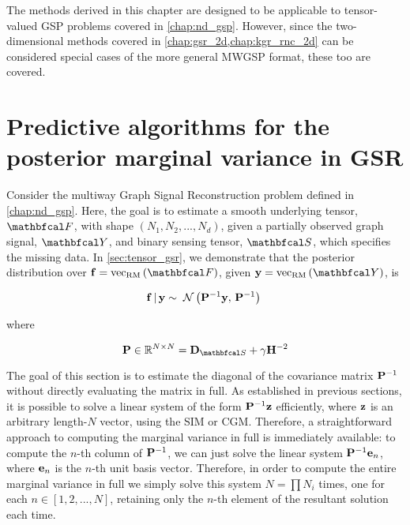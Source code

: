 The methods derived in this chapter are designed to be applicable to tensor-valued GSP problems covered in \cref{chap:nd_gsp}. However, since the two-dimensional methods covered in \cref{chap:gsr_2d,chap:kgr_rnc_2d} can be considered special cases of the more general MWGSP format, these too are covered. 

\section{Predictive algorithms for the posterior marginal variance in GSR}

Consider the multiway Graph Signal Reconstruction problem defined in \cref{chap:nd_gsp}. Here, the goal is to estimate a smooth underlying tensor, $\Ft$, with shape $(N_1, N_2, ..., N_d)$, given a partially observed graph signal, $\Yt$, and binary sensing tensor, $\St$, which specifies the missing data. In \cref{sec:tensor_gsr}, we demonstrate that the posterior distribution over $\f = \vecrm{\Ft}$, given $\y = \vecrm{\Yt}$, is

\begin{equation}
    \mathbf{f} \, | \, \mathbf{y} \sim \; \mathcal{N}\left(\mathbf{P}^{-1} \mathbf{y}, \, \mathbf{P}^{-1}\right) \;
\end{equation}

where 

\begin{equation}
    \PP \in \R^{N \times N} = \D_{\St} + \gamma \HH^{-2}
\end{equation}

The goal of this section is to estimate the diagonal of the covariance matrix $\mathbf{P}^{-1}$ without directly evaluating the matrix in full. As established in previous sections, it is possible to solve a linear system of the form $\mathbf{P}^{-1} \mathbf{z}$ efficiently, where $\mathbf{z}$ is an arbitrary length-$N$ vector, using the SIM or CGM. Therefore, a straightforward approach to computing the marginal variance in full is immediately available: to compute the $n$-th column of $\mathbf{P}^{-1}$, we can just solve the linear system $\mathbf{P}^{-1} \mathbf{e}_n$, where $\mathbf{e}_n$ is the $n$-th unit basis vector. Therefore, in order to compute the entire marginal variance in full we simply solve this system $N = \prod N_i$ times, one for each $n \in [1, 2, ..., N]$, retaining only the $n$-th element of the resultant solution each time. 
    
